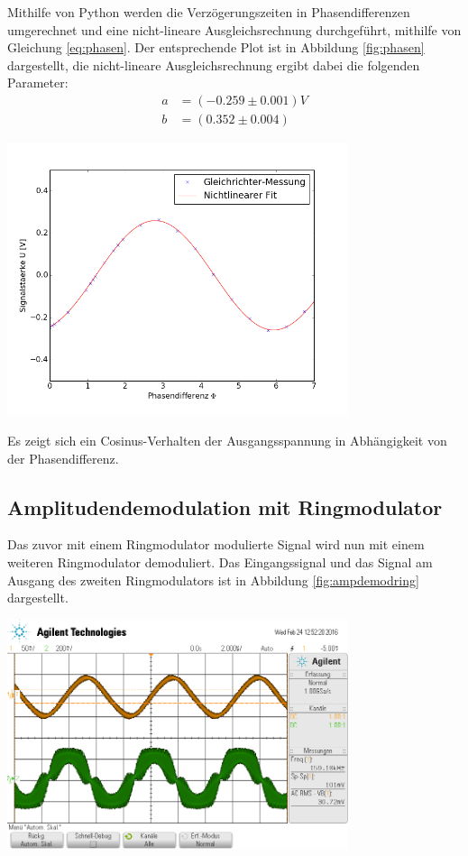 \documentclass[]{scrartcl}
\begin{document}
Mithilfe von Python werden die Verzögerungszeiten in Phasendifferenzen umgerechnet und eine nicht-lineare Ausgleichsrechnung durchgeführt, mithilfe von Gleichung \ref{eq:phasen}. Der entsprechende Plot ist in Abbildung \ref{fig:phasen} dargestellt, die nicht-lineare Ausgleichsrechnung ergibt dabei die folgenden Parameter:
\begin{align}
a &= (-0.259 \pm 0.001) V \\
b &= ( 0.352 \pm 0.004) 
\end{align}
\begin{center}
	\includegraphics[width=10cm]{images/plotgleich.png}
	\label{fig:phasen}
\end{center}
Es zeigt sich ein Cosinus-Verhalten der Ausgangsspannung in Abhängigkeit von der Phasendifferenz.

\subsection{Amplitudendemodulation mit Ringmodulator}
Das zuvor mit einem Ringmodulator modulierte Signal wird nun mit einem weiteren Ringmodulator demoduliert. Das Eingangssignal und das Signal am Ausgang des zweiten Ringmodulators ist in Abbildung \ref{fig:ampdemodring} dargestellt.
\begin{center}
	\includegraphics[width=10cm]{images/ampdemodring.png}
	\label{fig:ampdemodring}
\end{center}
\end{document}
